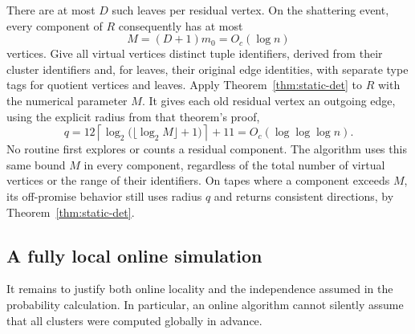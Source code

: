 \documentclass[11pt]{article}
\theoremstyle{definition}
\begin{document}
There are at most $D$ such leaves per residual vertex. On the shattering
event, every component of $R$ consequently has at most
\begin{equation}\label{eq:cleanup-M}
 M=(D+1)m_0=O_c(\log n)
\end{equation}
vertices. Give all virtual vertices distinct tuple identifiers, derived
from their cluster identifiers and, for leaves, their original edge
identities, with separate type tags for quotient vertices and leaves.
Apply Theorem~\ref{thm:static-det} to $R$ with the numerical
parameter $M$. It gives each old residual vertex an outgoing edge, using
the explicit radius from that theorem's proof,
\begin{equation}\label{eq:cleanup-radius}
 q=12\left\lceil\log_2\bigl(\lfloor\log_2 M\rfloor+1\bigr)\right\rceil+11
   =O_c(\log\log\log n).
\end{equation}
No routine first explores or counts a residual component. The algorithm
uses this same bound $M$ in every component, regardless of the total number
of virtual vertices or the range of their identifiers. On tapes where a
component exceeds $M$, its off-promise behavior still uses radius $q$ and
returns consistent directions, by Theorem~\ref{thm:static-det}.

\subsection{A fully local online simulation}

It remains to justify both online locality and the independence assumed in
the probability calculation. In particular, an online algorithm cannot
silently assume that all clusters were computed globally in advance.
\end{document}
